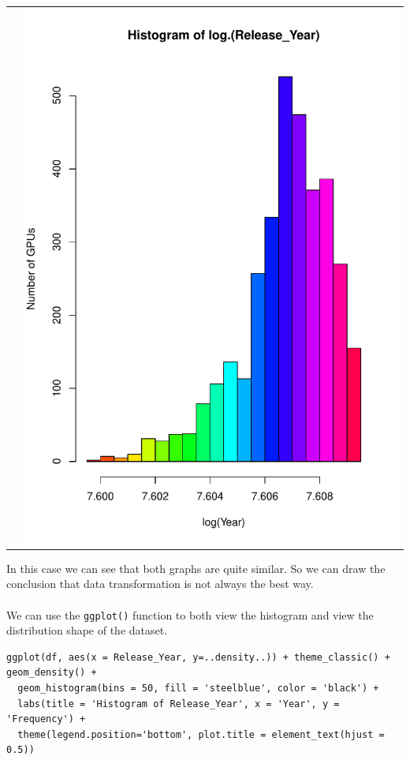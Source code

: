 \documentclass[a4paper]{article}
\begin{document}
\begin{center}
\begin{adjustbox}{width=1\textwidth}
\begin{tabular}{cc}
        &\includegraphics[keepaspectratio, width=1\textwidth, height=1\textheight]{Visualization/Hist/log.release_year.pdf}
    \end{tabular}
\end{adjustbox}
\end{center}
In this case we can see that both graphs are quite similar. So we can draw the conclusion that data transformation is not always the best way.\\\\
We can use the \verb|ggplot()| function to both view the histogram and view the distribution shape of the dataset.
\begin{mdframed}[leftline=false,rightline=false,backgroundcolor=lightblue!10,nobreak=false]
    \begin{verbatim}
ggplot(df, aes(x = Release_Year, y=..density..)) + theme_classic() +  geom_density() +
  geom_histogram(bins = 50, fill = 'steelblue', color = 'black') + 
  labs(title = 'Histogram of Release_Year', x = 'Year', y = 'Frequency') +
  theme(legend.position='bottom', plot.title = element_text(hjust = 0.5)) 
    \end{verbatim}
\end{mdframed}  
\end{document}
